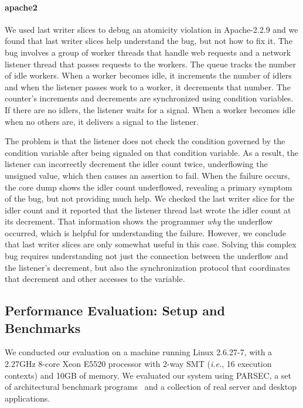 \documentclass[preprint,9pt]{sigplanconf}
\begin{document}
\paragraph{apache2}
We used last writer slices to debug an atomicity violation in Apache-2.2.9 and
we found that last writer slices help understand the bug, but not how to fix
it.  The bug involves a group of worker threads that handle web requests and a
network listener thread that passes requests to the workers.  The queue tracks
the number of idle workers.  When a worker becomes idle, it increments the
number of idlers and when the listener passes work to a worker, it decrements
that number.  The counter's increments and decrements are synchronized using
condition variables.  If there are no idlers, the listener waits for a signal.
When a worker becomes idle when no others are, it delivers a signal to the
listener.

The problem is that the listener does not check the condition governed by the
condition variable after being signaled on that condition variable.  As a
result, the listener can incorrectly decrement the idler count twice,
underflowing the unsigned value, which then causes an assertion to fail.  When
the failure occurs, the core dump shows the idler count underflowed, revealing
a primary symptom of the bug, but not providing much help.  We checked the last
writer slice for the idler count and it reported that the listener thread last
wrote the idler count at its decrement.  That information shows the programmer
{\em why} the underflow occurred, which is helpful for understanding the
failure.  However, we conclude that last writer slices are only somewhat 
useful in this case.  Solving this complex bug requires understanding not just
the connection between the underflow and the listener's decrement, but also the
synchronization protocol that coordinates that decrement and other accesses to
the variable.  

\subsection{Performance Evaluation: Setup and Benchmarks}

We conducted our evaluation on a machine running Linux 2.6.27-7, with a 2.27GHz
8-core Xeon E5520 processor with 2-way SMT ({\em i.e.}, 16 execution contexts)
and 10GB of memory.  We evaluated our system using PARSEC, a set of
architectural benchmark programs~\cite{parsec} and a collection of real server
and desktop applications.    
\end{document}
